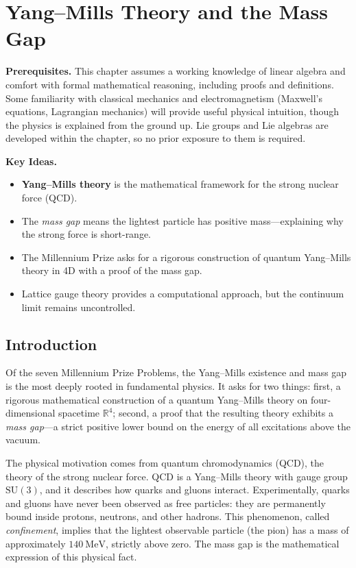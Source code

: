 \chapter{Yang--Mills Theory and the Mass Gap}
\label{ch:yangmills}

\medskip\noindent\textbf{Prerequisites.} This chapter assumes a working knowledge of linear algebra and comfort with formal mathematical reasoning, including proofs and definitions. Some familiarity with classical mechanics and electromagnetism (Maxwell's equations, Lagrangian mechanics) will provide useful physical intuition, though the physics is explained from the ground up. Lie groups and Lie algebras are developed within the chapter, so no prior exposure to them is required.

\noindent\textbf{Key Ideas.}
\begin{itemize}
  \item \textbf{Yang--Mills theory} is the mathematical framework for the strong nuclear force (QCD).
  \item The \emph{mass gap} means the lightest particle has positive mass---explaining why the strong force is short-range.
  \item The Millennium Prize asks for a rigorous construction of quantum Yang--Mills theory in 4D with a proof of the mass gap.
  \item Lattice gauge theory provides a computational approach, but the continuum limit remains uncontrolled.
\end{itemize}

\bigskip

\section{Introduction}

Of the seven Millennium Prize Problems, the Yang--Mills existence and mass gap is the most deeply rooted in fundamental physics. It asks for two things: first, a rigorous mathematical construction of a quantum Yang--Mills theory on four-dimensional spacetime $\mathbb{R}^4$; second, a proof that the resulting theory exhibits a \textit{mass gap}---a strict positive lower bound on the energy of all excitations above the vacuum.

The physical motivation comes from quantum chromodynamics (QCD), the theory of the strong nuclear force. QCD is a Yang--Mills theory with gauge group $\mathrm{SU}(3)$, and it describes how quarks and gluons interact. Experimentally, quarks and gluons have never been observed as free particles: they are permanently bound inside protons, neutrons, and other hadrons. This phenomenon, called \textit{confinement}, implies that the lightest observable particle (the pion) has a mass of approximately $140~\mathrm{MeV}$, strictly above zero. The mass gap is the mathematical expression of this physical fact.


